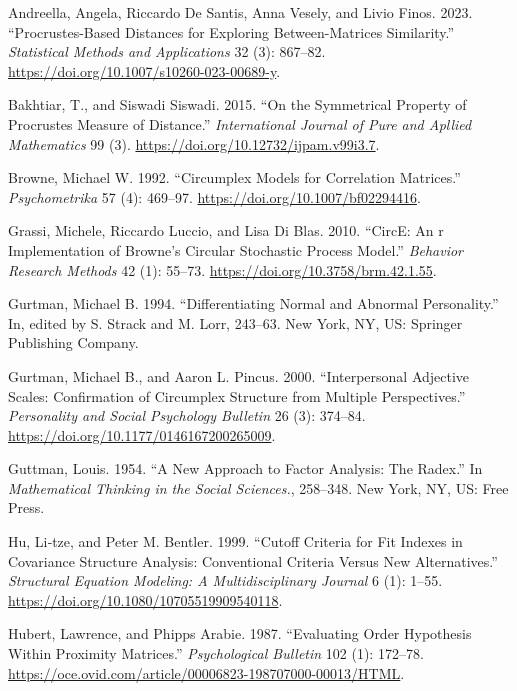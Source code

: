 \documentclass[
  default,
]{sn-jnl}
\newlength{\cslhangindent}
\newenvironment{CSLReferences}[2] %
 {\begin{list}{}{%
  \setlength{\itemindent}{0pt}
  \setlength{\leftmargin}{0pt}
  \setlength{\parsep}{0pt}
  \ifodd #1
   \setlength{\leftmargin}{\cslhangindent}
   \setlength{\itemindent}{-1\cslhangindent}
  \fi
  \setlength{\itemsep}{#2\baselineskip}}}
 {\end{list}}
\begin{document}
\label{refs}
\begin{CSLReferences}{1}{0}
Andreella, Angela, Riccardo De Santis, Anna Vesely, and Livio Finos.
2023. {``Procrustes-Based Distances for Exploring Between-Matrices
Similarity.''} \emph{Statistical Methods and Applications} 32 (3):
867--82. \url{https://doi.org/10.1007/s10260-023-00689-y}.

Bakhtiar, T., and Siswadi Siswadi. 2015. {``On the Symmetrical Property
of Procrustes Measure of Distance.''} \emph{International Journal of
Pure and Apllied Mathematics} 99 (3).
\url{https://doi.org/10.12732/ijpam.v99i3.7}.

Browne, Michael W. 1992. {``Circumplex Models for Correlation
Matrices.''} \emph{Psychometrika} 57 (4): 469--97.
\url{https://doi.org/10.1007/bf02294416}.

Grassi, Michele, Riccardo Luccio, and Lisa Di Blas. 2010. {``{CircE}: An
r Implementation of Browne's Circular Stochastic Process Model.''}
\emph{Behavior Research Methods} 42 (1): 55--73.
\url{https://doi.org/10.3758/brm.42.1.55}.

Gurtman, Michael B. 1994. {``Differentiating Normal and Abnormal
Personality.''} In, edited by S. Strack and M. Lorr, 243--63. New York,
NY, US: Springer Publishing Company.

Gurtman, Michael B., and Aaron L. Pincus. 2000. {``Interpersonal
Adjective Scales: Confirmation of Circumplex Structure from Multiple
Perspectives.''} \emph{Personality and Social Psychology Bulletin} 26
(3): 374--84. \url{https://doi.org/10.1177/0146167200265009}.

Guttman, Louis. 1954. {``A New Approach to Factor Analysis: The
Radex.''} In \emph{Mathematical Thinking in the Social Sciences.},
258--348. New York, NY, US: Free Press.

Hu, Li‐tze, and Peter M. Bentler. 1999. {``Cutoff Criteria for Fit
Indexes in Covariance Structure Analysis: Conventional Criteria Versus
New Alternatives.''} \emph{Structural Equation Modeling: A
Multidisciplinary Journal} 6 (1): 1--55.
\url{https://doi.org/10.1080/10705519909540118}.

Hubert, Lawrence, and Phipps Arabie. 1987. {``Evaluating Order
Hypothesis Within Proximity Matrices.''} \emph{Psychological Bulletin}
102 (1): 172--78.
\url{https://oce.ovid.com/article/00006823-198707000-00013/HTML}.


\end{CSLReferences}
\end{document}
